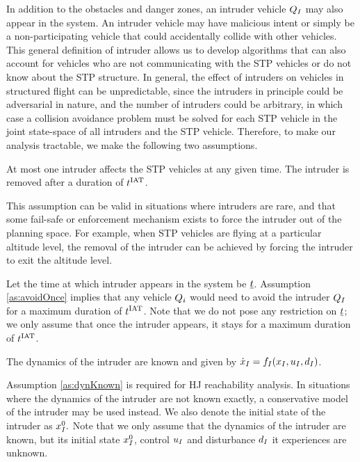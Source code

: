 In addition to the obstacles and danger zones, an intruder vehicle $Q_{I}$ may also appear in the system. An intruder vehicle may have malicious intent or simply be a non-participating vehicle that could accidentally collide with other vehicles. This general definition of intruder allows us to develop algorithms that can also account for vehicles who are not communicating with the STP vehicles or do not know about the STP structure. In general, the effect of intruders on vehicles in structured flight can be unpredictable, since the intruders in principle could be adversarial in nature, and the number of intruders could be arbitrary, in which case a collision avoidance problem must be solved for each STP vehicle in the joint state-space of all intruders and the STP vehicle. Therefore, to make our analysis tractable, we make the following two assumptions.

\begin{assumption}
\label{as:avoidOnce}
At most one intruder affects the STP vehicles at any given time. The intruder is removed after a duration of $t^\text{IAT}$. 
\end{assumption}

This assumption can be valid in situations where intruders are rare, and that some fail-safe or enforcement mechanism exists to force the intruder out of the planning space. For example, when STP vehicles are flying at a particular altitude level, the removal of the intruder can be achieved by forcing the intruder to exit the altitude level. 
 
Let the time at which intruder appears in the system be $\underline{t}$. Assumption \ref{as:avoidOnce} implies that any vehicle $Q_i$ would need to avoid the intruder $Q_{I}$ for a maximum duration of $t^\text{IAT}$.
Note that we do not pose any restriction on $\underline{t}$; we only assume that once the intruder appears, it stays for a maximum duration of $t^\text{IAT}$.
\begin{assumption}
\label{as:dynKnown}
The dynamics of the intruder are known and given by $\dot{x}_I = f_I(x_I, u_I, d_I)$.
\end{assumption}
Assumption \ref{as:dynKnown} is required for HJ reachability analysis. In situations where the dynamics of the intruder are not known exactly, a conservative model of the intruder may be used instead. We also denote the initial state of the intruder as $x_{I}^0.$ Note that we only assume that the dynamics of the intruder are known, but its initial state $x_{I}^0$, control $u_I$ and disturbance $d_I$ it experiences are unknown.

